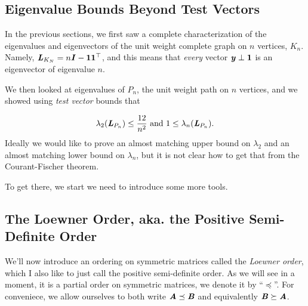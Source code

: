 
\subsection{Eigenvalue Bounds Beyond Test Vectors}

In the previous sections, we first saw a complete characterization of the
eigenvalues and eigenvectors of the unit weight complete graph on $n$
vertices, $K_n$. Namely, $\boldsymbol{\mathit{L}}_{K_N} = n\boldsymbol{\mathit{I}} - \boldsymbol{1} \boldsymbol{1}^\top$, and
this means that \emph{every} vector $\boldsymbol{\mathit{y}} \perp \boldsymbol{1}$ is an
eigenvector of eigenvalue $n$.

We then looked at eigenvalues of $P_n$, the unit weight path on $n$
vertices, and we showed using \emph{test vector} bounds that

\begin{equation}
  \label{eq:testvectorbounds}
\lambda_2(\boldsymbol{\mathit{L}}_{P_n}) \leq \frac{12}{n^2} \text{ and } 1 \leq
\lambda_n(\boldsymbol{\mathit{L}}_{P_n}).
\end{equation}
%
Ideally we would like to prove an almost matching upper bound on
$\lambda_2$ and an almost matching lower bound on $\lambda_n$, but it
is not clear how to get that from the Courant-Fischer theorem.

To get there, we start we need to introduce some more tools.

\subsection{The Loewner Order, aka. the Positive Semi-Definite Order}
We'll now introduce an ordering on symmetric matrices called the
\emph{Loewner order}, which I also like to just call the positive
semi-definite order.
As we will see in a moment, it is a partial order on symmetric matrices, we denote
it by ``$\preceq$''.
For conveniece, we allow ourselves to both write  $\boldsymbol{\mathit{A}} \preceq \boldsymbol{\mathit{B}}$
and equivalently $\boldsymbol{\mathit{B}} \succeq \boldsymbol{\mathit{A}}$.


